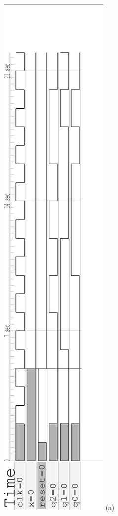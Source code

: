 \documentclass[12pt]{article}
\begin{document}
\begin{figure}
\center
\includegraphics[angle=-90,scale=0.7]{verilog/3bitcounter-up}
(a)

\end{figure}
\end{document}
